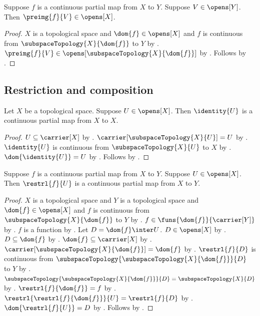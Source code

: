 \begin{theorem}\label{continuous_partial_map_preimage_open}
    Suppose $f$ is a continuous partial map from $X$ to $Y$.
    Suppose $V\in\opens[Y]$.
    Then $\preimg{f}{V}\in\opens[X]$.
\end{theorem}
\begin{proof}
    $X$ is a topological space and $\dom{f}\in\opens[X]$ and
        $f$ is continuous from $\subspaceTopology{X}{\dom{f}}$ to $Y$ by
        .
    $\preimg{f}{V}\in\opens[\subspaceTopology{X}{\dom{f}}]$ by
        .
    Follows by .
\end{proof}

\subsection{Restriction and composition}

\begin{theorem}\label{identity_continuous_partial_map}
    Let $X$ be a topological space.
    Suppose $U\in\opens[X]$.
    Then $\identity{U}$ is a continuous partial map from $X$ to $X$.
\end{theorem}
\begin{proof}
    $U\subseteq\carrier[X]$ by .
    $\carrier[\subspaceTopology{X}{U}]=U$ by
        .
    $\identity{U}$ is continuous from $\subspaceTopology{X}{U}$ to $X$ by
        .
    $\dom{\identity{U}}=U$ by .
    Follows by .
\end{proof}

\begin{theorem}\label{continuous_partial_map_restriction}
    Suppose $f$ is a continuous partial map from $X$ to $Y$.
    Suppose $U\in\opens[X]$.
    Then $\restrl{f}{U}$ is a continuous partial map from $X$ to $Y$.
\end{theorem}
\begin{proof}
    $X$ is a topological space and $Y$ is a topological space and
        $\dom{f}\in\opens[X]$ and
        $f$ is continuous from $\subspaceTopology{X}{\dom{f}}$ to $Y$ by
        .
    $f\in\funs{\dom{f}}{\carrier[Y]}$ by .
    $f$ is a function by .
    Let $D=\dom{f}\inter U$.
    $D\in\opens[X]$ by .
    $D\subseteq\dom{f}$ by .
    $\dom{f}\subseteq\carrier[X]$ by .
    $\carrier[\subspaceTopology{X}{\dom{f}}]=\dom{f}$ by
        .
    $\restrl{f}{D}$ is continuous from
        $\subspaceTopology{\subspaceTopology{X}{\dom{f}}}{D}$ to $Y$ by
        .
    $\subspaceTopology{\subspaceTopology{X}{\dom{f}}}{D}
        =\subspaceTopology{X}{D}$ by .
    $\restrl{f}{\dom{f}}=f$ by .
    $\restrl{\restrl{f}{\dom{f}}}{U}=\restrl{f}{D}$ by
        .
    $\dom{\restrl{f}{U}}=D$ by .
    Follows by .
\end{proof}

